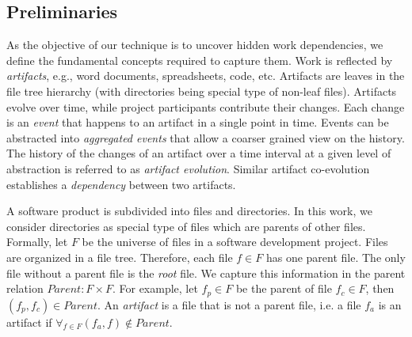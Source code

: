 \subsection{Preliminaries}
\label{subsec:prelim}





As the objective of our technique is to uncover hidden work dependencies, we define the fundamental concepts required to capture them. Work is reflected by \emph{artifacts}, e.g., word documents, spreadsheets, code, etc. Artifacts are leaves in the file tree hierarchy (with directories being special type of non-leaf files). %
Artifacts evolve over time, while project participants contribute their changes. Each change is an \emph{event} that happens to an artifact in a single point in time. Events can be abstracted into \emph{aggregated events} that allow a coarser grained view on the history. The history of the changes of an artifact over a time interval at a given level of abstraction is referred to as \emph{artifact evolution}. Similar artifact co-evolution establishes a \emph{dependency} between two artifacts. %

A software product is subdivided into files and directories. In this work, we consider directories as special type of files which are parents of other files. Formally, let $F$ be the universe of files in a software development project. Files are organized in a file tree. Therefore, each file $f \in F$ has one parent file. The only file without a parent file is the \emph{root} file. We capture this information in the parent relation $Parent: F \times F$. For example, let $f_p \in F$ be the parent of file $f_c \in F$, then $(f_p, f_c) \in Parent$. %
An \emph{artifact} is a file that is not a parent file, i.e. a file $f_a$ is an artifact if $\forall_{f \in F} (f_a, f) \notin Parent$.

